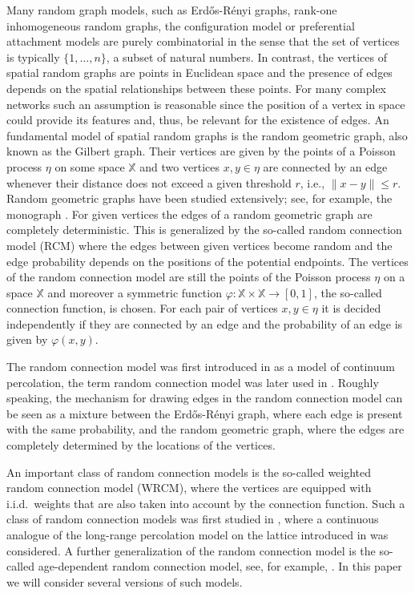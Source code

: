 \documentclass{article}
\theoremstyle{definition}
\numberwithin{equation}{section}
\theoremstyle{remark}
\begin{document}
Many random graph models, such as Erd\H{o}s-R\'enyi graphs, rank-one inhomogeneous random graphs, the configuration model or preferential attachment models are purely combinatorial in the sense that the set of vertices is typically $\{1,\ldots,n\}$, a subset of natural numbers. In contrast, the vertices of spatial random graphs are points in Euclidean space and 
the presence of edges depends on the spatial relationships between these points.
For many complex networks such an assumption is reasonable since the position of a vertex in space could provide its features and, thus, be relevant for the existence of edges. An fundamental model of spatial random graphs is the random geometric graph, also known as the Gilbert graph. Their vertices are given by the points of a Poisson process $\eta$ on some space $\mathbb{X}$ and two vertices $x,y\in\eta$ are connected by an edge whenever their distance does not exceed a given threshold $r$, i.e., $\|x-y\|\leq r$. Random geometric graphs have been studied extensively; see, for example, the monograph \cite{Penrose_book}. For given vertices the edges of a random geometric graph are completely deterministic. This is generalized by the so-called random connection model (RCM) where the edges between given vertices become random and the edge probability depends on the positions of the potential endpoints. The vertices of the random connection model are still the points of the Poisson process $\eta$ on a space $\mathbb{X}$ and moreover a symmetric function $\varphi:\mathbb{X}\times\mathbb{X}\to[0,1]$, the so-called connection function, is chosen. For each pair of vertices $x,y\in\eta$ it is decided independently if they are connected by an edge and the probability of an edge is given by $\varphi(x,y)$.

The random connection model was first introduced in \cite{Penrose1} as a model of continuum percolation, the term random connection model was later used in \cite{meesterroy}. Roughly speaking, the mechanism for drawing edges in the random connection model can be seen as a mixture between the Erd\H{o}s-R\'enyi graph, where each edge is present with the same probability, and the random geometric graph, where the edges are completely determined by the locations of the vertices.

An important class of random connection models is the so-called weighted random connection model (WRCM), where the vertices are equipped with i.i.d.\ weights that are also taken into account by the connection function. Such a class of random connection models was first studied in \cite{deprez2019scale}, where a continuous analogue of the long-range percolation model on the lattice introduced in \cite{deijfen2013scale} was considered. A further generalization of the random connection model is the so-called age-dependent random connection model, see, for example, \cite{gracar2019age}. In this paper we will consider several versions of such models.
\end{document}
